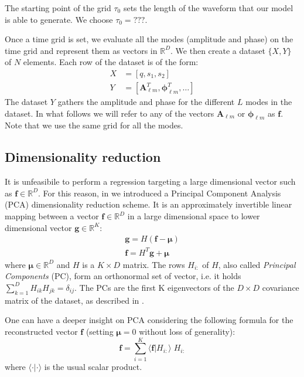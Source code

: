\documentclass[twocolumn,showpacs,preprintnumbers,nofootinbib,prd,
superscriptaddress,10pt]{revtex4-1}
\newcommand{\R}{\mathbb{R}}
\begin{document}
The starting point of the grid $\tau_0$ sets the length of the waveform that our model is able to generate. We choose $\tau_0 = \text{???}$.

Once a time grid is set, we evaluate all the modes (amplitude and phase) on the time grid and represent them as vectors in $\R^D$.
We then create a dataset $\{X, Y\}$ of $N$ elements. Each row of the dataset is of the form:
\begin{align}
	X &= [q, s_1, s_2] \\
	Y &= [\boldsymbol{A}^T_{\ell m}, \boldsymbol{\phi}^T_{\ell m}, \hdots ] 
\end{align}
%
The dataset $Y$ gathers the amplitude and phase for the different $L$ modes in the dataset.
In what follows we will refer to any of the vectors $\boldsymbol{A}_{\ell m}$ or $\boldsymbol{\phi}_{\ell m}$ as $\boldsymbol{f}$.
Note that we use the same grid for all the modes.

\subsection{Dimensionality reduction}
\label{sec:PCA}

It is unfeasibile to perform a regression targeting a large dimensional vector such as $\boldsymbol{f} \in \R^D$. For this reason, in \cite{Schmidt:2020yuu} we introduced a Principal Component Analysis (PCA) dimensionality reduction scheme.
It is an approximately invertible linear mapping between a vector $\boldsymbol{f} \in \R^D$ in a large dimensional space to lower dimensional vector  $\boldsymbol{g} \in \R^K$:
%
\begin{align}
	\mathbf{g} = H (\mathbf{f} - \boldsymbol{\mu}) \label{eq:PCA_reduction_model}\\
	\mathbf{f} = H^T \mathbf{g} + \boldsymbol{\mu} \label{eq:PCA_reconstruction_model}
\end{align}
where $\boldsymbol{\mu} \in \R^D$ and $H$ is a $K \times D$ matrix. The rows $H_{i:}$ of $H$, also called {\it Principal Components} (PC), form an orthonormal set of vector, i.e. it holds ${\sum_{k=1}^D H_{ik} H_{jk} = \delta_{ij}}$.
The PCs are the first K eigenvectors of the $D \times D$ covariance matrix of the dataset, as described in \cite[Sec. 12]{murphy2012machine}.

One can have a deeper insight on PCA considering the following formula for the reconstructed vector $\mathbf{f}$ (setting $\boldsymbol{\mu}=0$ without loss of generality):
\begin{equation} \label{eq:perturbative_exp}
	\mathbf{f} = \sum_{i=1}^K \langle \mathbf{f} | H_{i:} \rangle \; H_{i:}
\end{equation}
%
where $\langle \cdot | \cdot \rangle$ is the usual scalar product.
\end{document}
